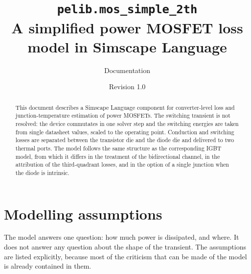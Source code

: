 \documentclass[11pt,a4paper]{article}
\title{\texttt{pelib.mos\_simple\_2th}\\
       A simplified power MOSFET loss model in Simscape Language}
\author{Documentation}
\date{Revision 1.0}
\begin{document}
\maketitle

\begin{abstract}
This document describes a Simscape Language component for converter-level loss
and junction-temperature estimation of power MOSFETs. The switching transient is
not resolved: the device commutates in one solver step and the switching
energies are taken from single datasheet values, scaled to the operating point.
Conduction and switching losses are separated between the transistor die and the
diode die and delivered to two thermal ports. The model follows the same
structure as the corresponding IGBT model, from which it differs in the
treatment of the bidirectional channel, in the attribution of the third-quadrant
losses, and in the option of a single junction when the diode is intrinsic.
\end{abstract}

\tableofcontents

\section{Modelling assumptions}

The model answers one question: how much power is dissipated, and where. It does
not answer any question about the shape of the transient. The assumptions are
listed explicitly, because most of the criticism that can be made of the model
is already contained in them.
\end{document}
